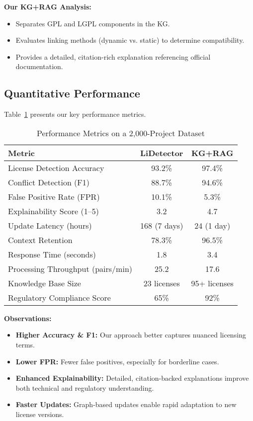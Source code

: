 \documentclass[12pt]{article}
\begin{document}
\textbf{Our KG+RAG Analysis:}
\begin{itemize}
    \item Separates GPL and LGPL components in the KG.
    \item Evaluates linking methods (dynamic vs. static) to determine compatibility.
    \item Provides a detailed, citation-rich explanation referencing official documentation.
\end{itemize}

\subsection{Quantitative Performance}
Table~\ref{tab:performance_metrics} presents our key performance metrics.

\begin{table}[!ht]
\centering
\caption{Performance Metrics on a 2,000-Project Dataset}
\begin{tabular}{|l|c|c|}
\hline
\textbf{Metric} & \textbf{LiDetector} & \textbf{KG+RAG} \\
\hline
License Detection Accuracy & 93.2\%  & 97.4\% \\
Conflict Detection (F1)    & 88.7\%  & 94.6\% \\
False Positive Rate (FPR)  & 10.1\%  & 5.3\%  \\
Explainability Score (1--5) & 3.2    & 4.7   \\
Update Latency (hours)      & 168 (7 days)   & 24 (1 day)    \\
Context Retention          & 78.3\%  & 96.5\% \\
Response Time (seconds)    & 1.8     & 3.4    \\
Processing Throughput (pairs/min) & 25.2 & 17.6 \\
Knowledge Base Size        & 23 licenses  & 95+ licenses \\
Regulatory Compliance Score & 65\%   & 92\%  \\
\hline
\end{tabular}
\label{tab:performance_metrics}
\end{table}

\noindent \textbf{Observations:}
\begin{itemize}
    \item \textbf{Higher Accuracy \& F1:} Our approach better captures nuanced licensing terms.
    \item \textbf{Lower FPR:} Fewer false positives, especially for borderline cases.
    \item \textbf{Enhanced Explainability:} Detailed, citation-backed explanations improve both technical and regulatory understanding.
    \item \textbf{Faster Updates:} Graph-based updates enable rapid adaptation to new license versions.
\end{itemize}
\end{document}
